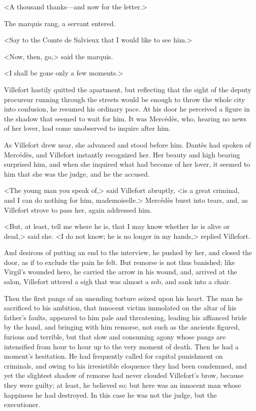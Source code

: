  <A thousand thanks—and now for the letter.> 

 The marquis rang, a servant entered. 

 <Say to the Comte de Salvieux that I would like to see him.> 

 <Now, then, go,> said the marquis. 

 <I shall be gone only a few moments.> 

 Villefort hastily quitted the apartment, but reflecting that the sight of the deputy procureur running through the streets would be enough to throw the whole city into confusion, he resumed his ordinary pace. At his door he perceived a figure in the shadow that seemed to wait for him. It was Mercédès, who, hearing no news of her lover, had come unobserved to inquire after him. 

 As Villefort drew near, she advanced and stood before him. Dantès had spoken of Mercédès, and Villefort instantly recognized her. Her beauty and high bearing surprised him, and when she inquired what had become of her lover, it seemed to him that she was the judge, and he the accused. 

 <The young man you speak of,> said Villefort abruptly, <is a great criminal, and I can do nothing for him, mademoiselle.> Mercédès burst into tears, and, as Villefort strove to pass her, again addressed him. 

 <But, at least, tell me where he is, that I may know whether he is alive or dead,> said she.  <I do not know; he is no longer in my hands,> replied Villefort. 

 And desirous of putting an end to the interview, he pushed by her, and closed the door, as if to exclude the pain he felt. But remorse is not thus banished; like Virgil's wounded hero, he carried the arrow in his wound, and, arrived at the salon, Villefort uttered a sigh that was almost a sob, and sank into a chair. 

 Then the first pangs of an unending torture seized upon his heart. The man he sacrificed to his ambition, that innocent victim immolated on the altar of his father's faults, appeared to him pale and threatening, leading his affianced bride by the hand, and bringing with him remorse, not such as the ancients figured, furious and terrible, but that slow and consuming agony whose pangs are intensified from hour to hour up to the very moment of death. Then he had a moment's hesitation. He had frequently called for capital punishment on criminals, and owing to his irresistible eloquence they had been condemned, and yet the slightest shadow of remorse had never clouded Villefort's brow, because they were guilty; at least, he believed so; but here was an innocent man whose happiness he had destroyed. In this case he was not the judge, but the executioner. 

